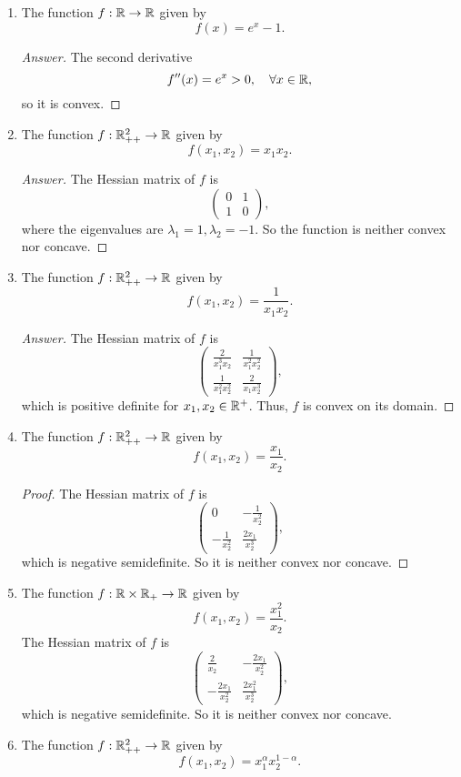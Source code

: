 \begin{enumerate}
	\item The function \(f: \mathbb{R} \to \mathbb{R}\) given by
	\[ f(x)=e^x-1. \]
	\begin{proof}[Answer]
	The second derivative
	\[f''(x)=e^x>0,\quad \forall x\in\mathbb{R}, \]
	so it is convex.
	\end{proof}
	\item The function \(f: \mathbb{R}_{++}^2 \to \mathbb{R}\) given by
	\[ f(x_1,x_2)=x_1 x_2. \]
	\begin{proof}[Answer]
	The Hessian matrix of \(f\) is
	\[ \begin{pmatrix} 0 & 1 \\ 1 & 0 \end{pmatrix}, \]
	where the eigenvalues are \(\lambda_1=1,\lambda_2=-1\).
	So the function is neither convex nor concave.
	\end{proof}
	\item The function \(f: \mathbb{R}_{++}^2 \to \mathbb{R}\) given by
	\[ f(x_1,x_2)=\frac{1}{x_1 x_2}. \]
	\begin{proof}[Answer]
	The Hessian matrix of \(f\) is
	\[ \begin{pmatrix} \frac{2}{x_1^3 x_2} & \frac{1}{x_1^2 x_2^2} \\ \frac{1}{x_1^2 x_2^2} & \frac{2}{x_1 x_2^3} \end{pmatrix}, \]
	which is positive definite for \(x_1,x_2\in\mathbb{R}^{+}\).
	Thus, \(f\) is convex on its domain.
	\end{proof}
	\item The function \(f: \mathbb{R}_{++}^2 \to \mathbb{R}\) given by
	\[ f(x_1,x_2)=\frac{x_1}{x_2}. \]
	\begin{proof}
	The Hessian matrix of \(f\) is
	\[ \begin{pmatrix} 0 & -\frac{1}{x_2^2} \\ -\frac{1}{x_2^2} & \frac{2x_1}{x_2^3} \end{pmatrix}, \]
	which is negative semidefinite.
	So it is neither convex nor concave.
	\end{proof}
	\item The function \(f: \mathbb{R}\times\mathbb{R}_+ \to \mathbb{R}\) given by
	\[ f(x_1,x_2)=\frac{x_1^2}{x_2}. \]
	The Hessian matrix of \(f\) is
	\[ \begin{pmatrix} \frac{2}{x_2} & -\frac{2x_1}{x_2^2} \\ -\frac{2x_1}{x_2^2} & \frac{2x_1^2}{x_2^3} \end{pmatrix}, \]
	which is negative semidefinite.
	So it is neither convex nor concave.
	\item The function \(f: \mathbb{R}_{++}^2 \to \mathbb{R}\) given by
	\[ f(x_1,x_2)=x_1^\alpha x_2^{1-\alpha}. \]
\end{enumerate}


